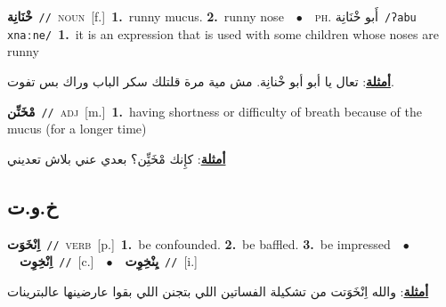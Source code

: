 \documentclass[10pt,a4paper,twoside]{article} %
\begin{document}
\begin{multicols}{2}
{\setlength\topsep{0pt}\textbf{\foreignlanguage{arabic}{خْنَانِة}}\ {\color{gray}\texttt{//}\color{black}}\ \textsc{noun}\ [f.]\ \textbf{1.}~runny mucus.  \textbf{2.}~runny nose\ \ $\bullet$\ \ \textsc{ph.} \color{gray} \foreignlanguage{arabic}{أَبو خْنَانِة}\color{black}\ {\color{gray}\texttt{/{\sffamily ʔabu xnaːne}/}\color{black}}\ \textbf{1.}~it is an expression that is used with some children whose noses are runny\  \begin{flushright}\color{gray}\foreignlanguage{arabic}{\textbf{\underline{\foreignlanguage{arabic}{أمثلة}}}: تعال يا أبو أبو خْنانِة. مش مية مرة قلتلك سكر الباب وراك بس تفوت.}\end{flushright}\color{black}} \vspace{2mm}

{\setlength\topsep{0pt}\textbf{\foreignlanguage{arabic}{مْخَنِّن}}\ {\color{gray}\texttt{//}\color{black}}\ \textsc{adj}\ [m.]\ \textbf{1.}~having shortness or difficulty of breath because of the mucus (for a longer time)\  \begin{flushright}\color{gray}\foreignlanguage{arabic}{\textbf{\underline{\foreignlanguage{arabic}{أمثلة}}}: كإِنك مْخَنِِّن؟ بعدي عني بلاش تعديني}\end{flushright}\color{black}} \vspace{2mm}

\vspace{-3mm}
\subsection*{\color{blue}\foreignlanguage{arabic}{خ.و.ت}\color{blue}{}} 

{\setlength\topsep{0pt}\textbf{\foreignlanguage{arabic}{اِنْخَوَت}}\ {\color{gray}\texttt{//}\color{black}}\ \textsc{verb}\ [p.]\ \textbf{1.}~be confounded.  \textbf{2.}~be baffled.  \textbf{3.}~be impressed\ \ $\bullet$\ \ \setlength\topsep{0pt}\textbf{\foreignlanguage{arabic}{اِنْخِوِت}}\ {\color{gray}\texttt{//}\color{black}}\ [c.]\ \ $\bullet$\ \ \setlength\topsep{0pt}\textbf{\foreignlanguage{arabic}{يِنْخِوِت}}\ {\color{gray}\texttt{//}\color{black}}\ [i.]\  \begin{flushright}\color{gray}\foreignlanguage{arabic}{\textbf{\underline{\foreignlanguage{arabic}{أمثلة}}}: والله اِنْخَوَتت من تشكيلة الفساتين اللي بتجنن اللي بقوا عارضينها عالبترينات}\end{flushright}\color{black}} \vspace{2mm}


\end{multicols}
\end{document}
